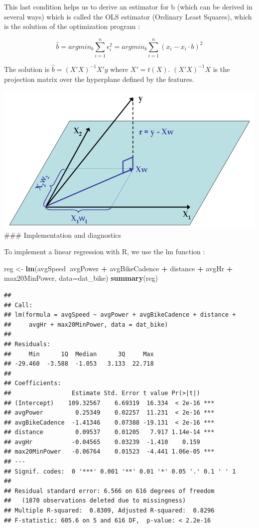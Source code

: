 \documentclass[
]{book}
\newenvironment{Shaded}{\begin{snugshade}}{\end{snugshade}}
\newcommand{\DataTypeTok}[1]{\textcolor[rgb]{0.13,0.29,0.53}{#1}}
\newcommand{\KeywordTok}[1]{\textcolor[rgb]{0.13,0.29,0.53}{\textbf{#1}}}
\newcommand{\NormalTok}[1]{#1}
\newcommand{\OperatorTok}[1]{\textcolor[rgb]{0.81,0.36,0.00}{\textbf{#1}}}
\newcommand{\StringTok}[1]{\textcolor[rgb]{0.31,0.60,0.02}{#1}}
\begin{document}
This last condition helps us to derive an estimator for b (which can be derived in several ways) which is called the OLS estimator (Ordinary Least Squares), which is the solution of the optimization program :

\[\hat{b}=argmin_b \sum_{i=1}^n \epsilon_i^2 = argmin_b \sum_{i=1}^n (x_i-x_i \cdot b)^2\]

The solution is \(\hat{b} = (X'X)^{-1}X'y\) where \(X'=t(X)\). \((X'X)^{-1}X\) is the projection matrix over the hyperplane defined by the features.

\includegraphics{img/ols-regression-geometry.png}
\#\#\# Implementation and diagnostics

To implement a linear regression with R, we use the lm function :

\begin{Shaded}
\begin{Highlighting}[]
\NormalTok{reg <-}\StringTok{ }\KeywordTok{lm}\NormalTok{(avgSpeed}\OperatorTok{~}\NormalTok{avgPower }\OperatorTok{+}\StringTok{ }\NormalTok{avgBikeCadence }\OperatorTok{+}\StringTok{ }\NormalTok{distance }\OperatorTok{+}\StringTok{ }\NormalTok{avgHr }\OperatorTok{+}\StringTok{ }\NormalTok{max20MinPower, }\DataTypeTok{data=}\NormalTok{dat_bike)}
\KeywordTok{summary}\NormalTok{(reg)}
\end{Highlighting}
\end{Shaded}

\begin{verbatim}
## 
## Call:
## lm(formula = avgSpeed ~ avgPower + avgBikeCadence + distance + 
##     avgHr + max20MinPower, data = dat_bike)
## 
## Residuals:
##     Min      1Q  Median      3Q     Max 
## -29.460  -3.588  -1.053   3.133  22.718 
## 
## Coefficients:
##                 Estimate Std. Error t value Pr(>|t|)    
## (Intercept)    109.32567    6.69319  16.334  < 2e-16 ***
## avgPower         0.25349    0.02257  11.231  < 2e-16 ***
## avgBikeCadence  -1.41346    0.07388 -19.131  < 2e-16 ***
## distance         0.09537    0.01205   7.917 1.14e-14 ***
## avgHr           -0.04565    0.03239  -1.410    0.159    
## max20MinPower   -0.06764    0.01523  -4.441 1.06e-05 ***
## ---
## Signif. codes:  0 '***' 0.001 '**' 0.01 '*' 0.05 '.' 0.1 ' ' 1
## 
## Residual standard error: 6.566 on 616 degrees of freedom
##   (1870 observations deleted due to missingness)
## Multiple R-squared:  0.8309,	Adjusted R-squared:  0.8296 
## F-statistic: 605.6 on 5 and 616 DF,  p-value: < 2.2e-16
\end{verbatim}
\end{document}

